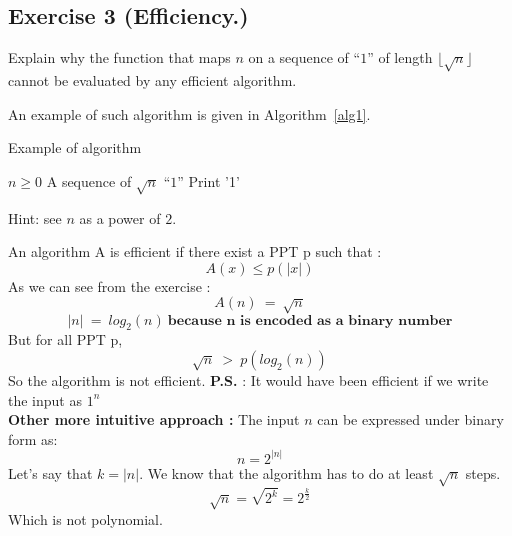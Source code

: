 \subsection{Exercise 3 (Efficiency.)}
Explain why the function that maps $n$ on a sequence of ``$1$'' of length
$\lfloor \sqrt{n}\rfloor$ cannot be evaluated by any efficient algorithm.

An example of such algorithm is given in Algorithm~\ref{alg1}.

\begin{algorithm}                      
\caption{Example of algorithm}         
\label{alg1}                             
\begin{algorithmic}                    
    \REQUIRE $n \geq 0$
    \ENSURE A sequence of $\sqrt{n}$ ``$1$''
        \STATE Print '1'
    \ENDFOR
\end{algorithmic}
\end{algorithm}
 
Hint: see $n$ as a power of $2$.  
\begin{solution}
  An algorithm A is efficient if there exist a PPT p such that : 
  $$ A(x) \leq p(|x|) $$
  As we can see from the exercise : 
  $$A(n) \ = \ \sqrt{n} $$
  $$ |n| \ = \ log_2(n) \ \textbf{because n is encoded as a binary number} $$
  But for all PPT p, 
  $$ \sqrt{n} \ > \ p(log_2(n)) $$
  So the algorithm is not efficient. 
  \newline \newline
  \textbf{P.S.} : It would have been efficient if we write the input as $1^n$\\
  
  \textbf{Other more intuitive approach : }
  The input $n$ can be expressed under binary form as: $$n = 2^{|n|}$$ 
  Let's say that $k = |n|$. We know that the algorithm has to do at least $\sqrt{n}$ steps.
  $$\sqrt{n} = \sqrt{2^k} = 2^{\frac{k}{2}}$$
  Which is not polynomial.
\end{solution}


